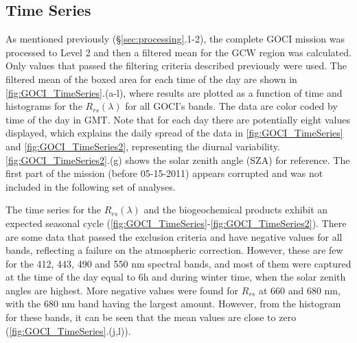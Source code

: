 \documentclass[onecolumn,3p,letterpaper,11pt]{elsarticle}
\begin{document}

\subsection{Time Series}\label{subsec:timeseries}
As mentioned previously (\S\ref{sec:processing}.1-2), the complete GOCI mission was processed to Level 2 and then a filtered mean for the GCW region was calculated. Only values that passed the filtering criteria described previously were used. The filtered mean of the boxed area for each time of the day are shown in \autoref{fig:GOCI_TimeSeries}.(a-l), where results are plotted as a function of time and histograms for the $R_{rs}(\lambda)$ for all GOCI's bands. The data are color coded by time of the day in GMT. Note that for each day there are potentially eight values displayed, which explains the daily spread of the data in \autoref{fig:GOCI_TimeSeries} and \autoref{fig:GOCI_TimeSeries2}, representing the diurnal variability. \autoref{fig:GOCI_TimeSeries2}.(g) shows the solar zenith angle (SZA) for reference. The first part of the mission (before 05-15-2011) appears corrupted and was not included in the following set of analyses.

The time series for the $R_{rs}(\lambda)$ and the biogeochemical products exhibit an expected seasonal cycle (\autoref{fig:GOCI_TimeSeries}-\ref{fig:GOCI_TimeSeries2}). 
There are some data that passed the exclusion criteria and have negative values for all bands, reflecting a failure on the atmospheric correction. However, these are few for the 412, 443, 490 and 550 nm spectral bands, and most of them were captured at the time of the day equal to 6h and during winter time, when the solar zenith angles are highest. More negative values were found for $R_{rs}$ at 660 and 680 nm, with the 680 nm band having the largest amount. However, from the histogram for these bands, it can be seen that the mean values are close to zero (\autoref{fig:GOCI_TimeSeries}.(j,l)). 
\end{document}
